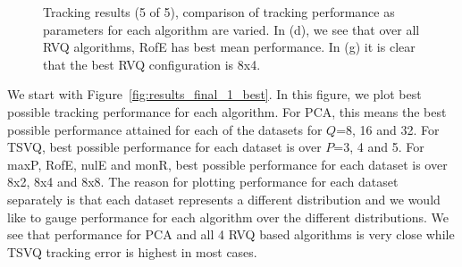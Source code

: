 \begin{Body}
\begin{figure}[h!]
								\caption{Tracking results (5 of 5), comparison of tracking performance as parameters for each algorithm are varied.  In (d), we see that over all RVQ algorithms, RofE has best mean performance.  In (g) it is clear that the best RVQ configuration is 8x4.}
								\label{fig:results_final_5_configs}
								\end{figure}



We start with Figure~\ref{fig:results_final_1_best}.  In this figure, we plot best possible tracking performance for each algorithm.  For PCA, this means the best possible performance attained for each of the datasets for $Q$=8, 16 and 32.  For TSVQ, best possible performance for each dataset is over $P$=3, 4 and 5.  For maxP, RofE, nulE and monR, best possible performance for each dataset is over 8x2, 8x4 and 8x8.  The reason for plotting performance for each dataset separately is that each dataset represents a different distribution and we would like to gauge performance for each algorithm over the different distributions.  We see that performance for PCA and all 4 RVQ based algorithms is very close while TSVQ tracking error is highest in most cases.  


\end{Body}
